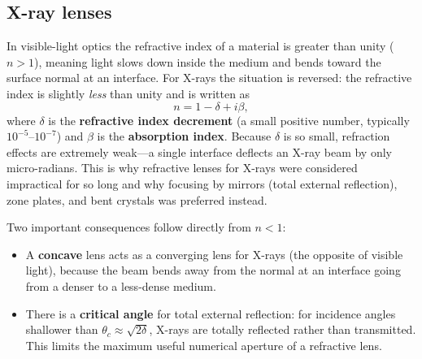 \subsection{X-ray lenses}


In visible-light optics the refractive index of a material is greater than
unity ($n>1$), meaning light slows down inside the medium and bends toward the
surface normal at an interface.  For X-rays the situation is reversed: the
refractive index is slightly \emph{less} than unity and is written as
%
\begin{equation}
  n = 1 - \delta + i\beta,
  \label{eq:refindex}
\end{equation}
%
where $\delta$ is the \textbf{refractive index decrement} (a small positive
number, typically $10^{-5}$--$10^{-7}$) and $\beta$ is the \textbf{absorption
index}.  Because $\delta$ is so small, refraction effects are extremely
weak---a single interface deflects an X-ray beam by only micro-radians.  This
is why refractive lenses for X-rays were considered impractical for so long and
why focusing by mirrors (total external reflection), zone plates, and bent
crystals was preferred instead.

Two important consequences follow directly from $n < 1$:
\begin{itemize}
  \item A \textbf{concave} lens acts as a converging lens for X-rays (the
        opposite of visible light), because the beam bends away from the normal
        at an interface going from a denser to a less-dense medium.
  \item There is a \textbf{critical angle} for total external reflection: for
        incidence angles shallower than
        $\theta_c \approx \sqrt{2\delta}$, X-rays are totally reflected rather
        than transmitted.  This limits the maximum useful numerical aperture of
        a refractive lens.
\end{itemize}

